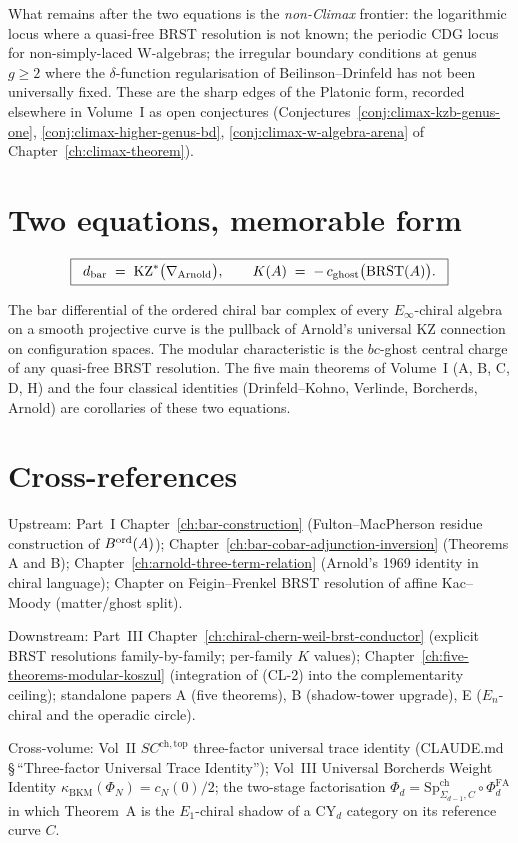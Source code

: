 What remains after the two equations is the \emph{non-Climax} frontier:
the logarithmic locus where a quasi-free BRST resolution is not known;
the periodic CDG locus for non-simply-laced W-algebras; the irregular
boundary conditions at genus \(g \geq 2\) where the \(\delta\)-function
regularisation of Beilinson--Drinfeld has not been universally fixed.
These are the sharp edges of the Platonic form, recorded elsewhere in
Volume~I as open conjectures
(Conjectures~\ref{conj:climax-kzb-genus-one},
\ref{conj:climax-higher-genus-bd}, \ref{conj:climax-w-algebra-arena}
of Chapter~\ref{ch:climax-theorem}).

\section{Two equations, memorable form}
\label{sec:climax-memorable}

\[
  \boxed{\;\;
    d_{\mathrm{bar}} \;=\; \mathrm{KZ}^{*}\bigl(\nabla_{\mathrm{Arnold}}\bigr),
    \qquad
    K(A) \;=\; -\,c_{\mathrm{ghost}}\bigl(\mathrm{BRST}(A)\bigr).
  \;\;}
\]

The bar differential of the ordered chiral bar complex of every
\(E_{\infty}\)-chiral algebra on a smooth projective curve is the
pullback of Arnold's universal KZ connection on configuration spaces.
The modular characteristic is the \(bc\)-ghost central charge of any
quasi-free BRST resolution. The five main theorems of Volume~I
\textup{(A, B, C, D, H)} and the four classical identities
\textup{(Drinfeld--Kohno, Verlinde, Borcherds, Arnold)} are corollaries
of these two equations.

\section*{Cross-references}

Upstream: Part~I Chapter~\ref{ch:bar-construction}
(Fulton--MacPherson residue construction of \(B^{\mathrm{ord}}(A)\));
Chapter~\ref{ch:bar-cobar-adjunction-inversion} (Theorems A and B);
Chapter~\ref{ch:arnold-three-term-relation} (Arnold's 1969 identity
in chiral language); Chapter on Feigin--Frenkel BRST resolution of
affine Kac--Moody (matter/ghost split).

Downstream: Part~III Chapter~\ref{ch:chiral-chern-weil-brst-conductor}
(explicit BRST resolutions family-by-family; per-family \(K\) values);
Chapter~\ref{ch:five-theorems-modular-koszul} (integration of
\textup{(CL-2)} into the complementarity ceiling); standalone papers
A (five theorems), B (shadow-tower upgrade), E (\(E_{n}\)-chiral and
the operadic circle).

Cross-volume: Vol~II \(SC^{\mathrm{ch,top}}\) three-factor universal
trace identity (CLAUDE.md \S\,``Three-factor Universal Trace Identity'');
Vol~III Universal Borcherds Weight Identity
\(\kappa_{\mathrm{BKM}}(\Phi_{N}) = c_{N}(0)/2\); the two-stage
factorisation \(\Phi_{d} = \mathrm{Sp}^{\mathrm{ch}}_{\Sigma_{d-1}, C}
\circ \Phi^{\mathrm{FA}}_{d}\) in which Theorem~A is the \(E_{1}\)-chiral
shadow of a CY\(_{d}\) category on its reference curve \(C\).
